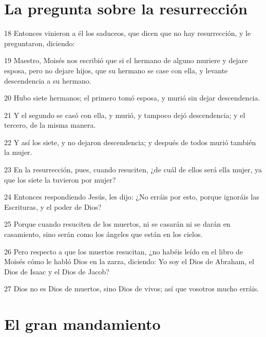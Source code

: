 \section*{La pregunta sobre la resurrección}

\par 18 Entonces vinieron a él los saduceos, que dicen que no hay resurrección, y le preguntaron, diciendo:
\par 19 Maestro, Moisés nos escribió que si el hermano de alguno muriere y dejare esposa, pero no dejare hijos, que su hermano se case con ella, y levante descendencia a su hermano.
\par 20 Hubo siete hermanos; el primero tomó esposa, y murió sin dejar descendencia.
\par 21 Y el segundo se casó con ella, y murió, y tampoco dejó descendencia; y el tercero, de la misma manera.
\par 22 Y así los siete, y no dejaron descendencia; y después de todos murió también la mujer.
\par 23 En la resurrección, pues, cuando resuciten, ¿de cuál de ellos será ella mujer, ya que los siete la tuvieron por mujer?
\par 24 Entonces respondiendo Jesús, les dijo: ¿No erráis por esto, porque ignoráis las Escrituras, y el poder de Dios?
\par 25 Porque cuando resuciten de los muertos, ni se casarán ni se darán en casamiento, sino serán como los ángeles que están en los cielos.
\par 26 Pero respecto a que los muertos resucitan, ¿no habéis leído en el libro de Moisés cómo le habló Dios en la zarza, diciendo: Yo soy el Dios de Abraham, el Dios de Isaac y el Dios de Jacob?
\par 27 Dios no es Dios de muertos, sino Dios de vivos; así que vosotros mucho erráis.

\section*{El gran mandamiento}

